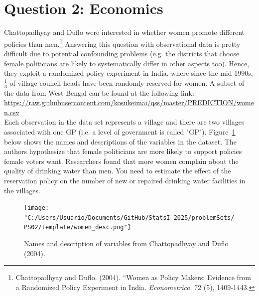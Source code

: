 \documentclass[12pt,letterpaper]{article}
\begin{document}
\section*{Question 2: Economics}
Chattopadhyay and Duflo were interested in whether women promote different policies than men.\footnote{Chattopadhyay and Duflo. (2004). ``Women as Policy Makers: Evidence from a Randomized Policy Experiment in India. \textit{Econometrica}. 72 (5), 1409-1443.} Answering this question with observational data is pretty difficult due to potential confounding problems (e.g. the districts that choose female politicians are likely to systematically differ in other aspects too). Hence, they exploit a randomized policy experiment in India, where since the mid-1990s, $\frac{1}{3}$ of village council heads have been randomly reserved for women. A subset of the data from West Bengal can be found at the following link: \url{https://raw.githubusercontent.com/kosukeimai/qss/master/PREDICTION/women.csv}\\

\noindent Each observation in the data set represents a village and there are two villages associated with one GP (i.e. a level of government is called "GP"). Figure~\ref{fig:women_desc} below shows the names and descriptions of the variables in the dataset. The authors hypothesize that female politicians are more likely to support policies female voters want. Researchers found that more women complain about the quality of drinking water than men. You need to estimate the effect of the reservation policy on the number of new or repaired drinking water facilities in the villages.
\vspace{.5cm}
\begin{figure}[h!]
	\caption{\footnotesize{Names and description of variables from Chattopadhyay and Duflo (2004).}}
	\vspace{.5cm}
	\centering
	\label{fig:women_desc}
	\texttt{[image: "C:/Users/Usuario/Documents/GitHub/StatsI\_2025/problemSets/PS02/template/women\_desc.png"]}
\end{figure}		
\end{document}
